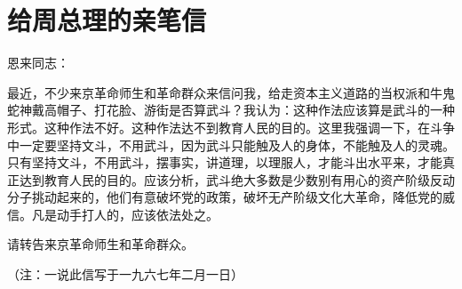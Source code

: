 \section[给周总理的亲笔信（一九六六年十二月二十七日）]{给周总理的亲笔信}


\noindent 恩来同志：

最近，不少来京革命师生和革命群众来信问我，给走资本主义道路的当权派和牛鬼蛇神戴高帽子、打花脸、游街是否算武斗？我认为：这种作法应该算是武斗的一种形式。这种作法不好。这种作法达不到教育人民的目的。这里我强调一下，在斗争中一定要坚持文斗，不用武斗，因为武斗只能触及人的身体，不能触及人的灵魂。只有坚持文斗，不用武斗，摆事实，讲道理，以理服人，才能斗出水平来，才能真正达到教育人民的目的。应该分析，武斗绝大多数是少数别有用心的资产阶级反动分子挑动起来的，他们有意破坏党的政策，破坏无产阶级文化大革命，降低党的威信。凡是动手打人的，应该依法处之。

请转告来京革命师生和革命群众。


（注：一说此信写于一九六七年二月一日）

